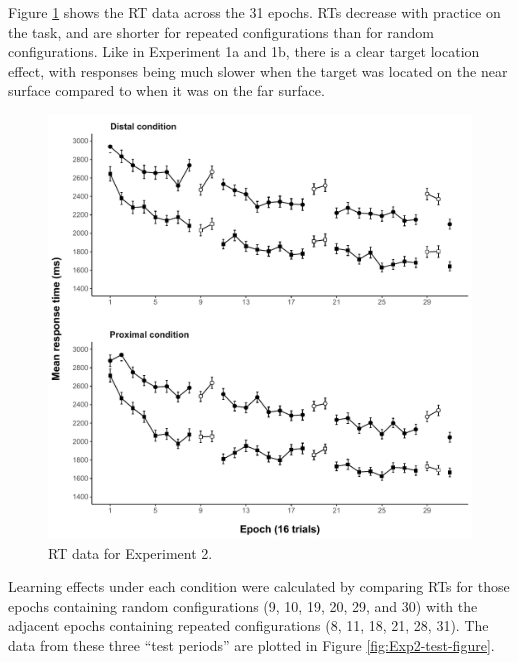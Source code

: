 \documentclass[
  english,
  man,floatsintext]{apa7}
\begin{document}
Figure \ref{fig:Exp2-RT-figure} shows the RT data across the 31 epochs. RTs decrease with practice on the task, and are shorter for repeated configurations than for random configurations. Like in Experiment 1a and 1b, there is a clear target location effect, with responses being much slower when the target was located on the near surface compared to when it was on the far surface.



\begin{figure}

{\centering \includegraphics{CCVR_manuscript_files/figure-latex/Exp2-RT-figure-1} 

}

\caption{RT data for Experiment 2.}\label{fig:Exp2-RT-figure}
\end{figure}

Learning effects under each condition were calculated by comparing RTs for those epochs containing random configurations (9, 10, 19, 20, 29, and 30) with the adjacent epochs containing repeated configurations (8, 11, 18, 21, 28, 31). The data from these three ``test periods'' are plotted in Figure \ref{fig:Exp2-test-figure}.
\end{document}

